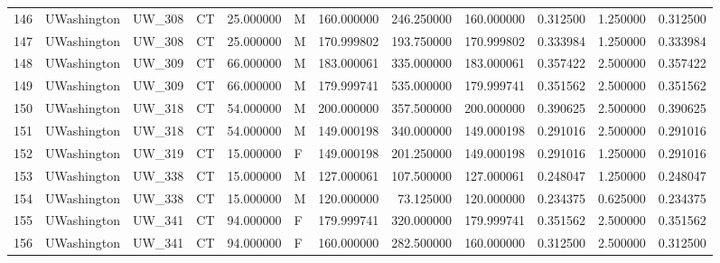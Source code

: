 \begin{tabular}{llllrlrrrrrr}
146    &     UWashington &       UW\_308 &                 CT &  25.000000 &        M &       160.000000 &    246.250000 &  160.000000 &               0.312500 &            1.250000 &          0.312500 \\
147    &     UWashington &       UW\_308 &                 CT &  25.000000 &        M &       170.999802 &    193.750000 &  170.999802 &               0.333984 &            1.250000 &          0.333984 \\
148    &     UWashington &       UW\_309 &                 CT &  66.000000 &        M &       183.000061 &    335.000000 &  183.000061 &               0.357422 &            2.500000 &          0.357422 \\
149    &     UWashington &       UW\_309 &                 CT &  66.000000 &        M &       179.999741 &    535.000000 &  179.999741 &               0.351562 &            2.500000 &          0.351562 \\
150    &     UWashington &       UW\_318 &                 CT &  54.000000 &        M &       200.000000 &    357.500000 &  200.000000 &               0.390625 &            2.500000 &          0.390625 \\
151    &     UWashington &       UW\_318 &                 CT &  54.000000 &        M &       149.000198 &    340.000000 &  149.000198 &               0.291016 &            2.500000 &          0.291016 \\
152    &     UWashington &       UW\_319 &                 CT &  15.000000 &        F &       149.000198 &    201.250000 &  149.000198 &               0.291016 &            1.250000 &          0.291016 \\
153    &     UWashington &       UW\_338 &                 CT &  15.000000 &        M &       127.000061 &    107.500000 &  127.000061 &               0.248047 &            1.250000 &          0.248047 \\
154    &     UWashington &       UW\_338 &                 CT &  15.000000 &        M &       120.000000 &     73.125000 &  120.000000 &               0.234375 &            0.625000 &          0.234375 \\
155    &     UWashington &       UW\_341 &                 CT &  94.000000 &        F &       179.999741 &    320.000000 &  179.999741 &               0.351562 &            2.500000 &          0.351562 \\
156    &     UWashington &       UW\_341 &                 CT &  94.000000 &        F &       160.000000 &    282.500000 &  160.000000 &               0.312500 &            2.500000 &          0.312500 \\

\end{tabular}
